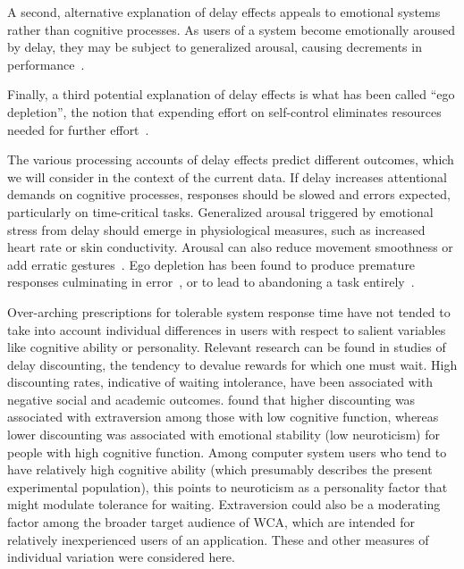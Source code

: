 \documentclass[10pt,letterpaper]{article}
\providecommand{\DIFaddtex}[1]{#1} %
\providecommand{\DIFdeltex}[1]{} %
\providecommand{\DIFaddbegin}{\protect\color{blue}} %
\providecommand{\DIFaddend}{\protect\color{black}} %
\providecommand{\DIFdelbegin}{\protect\color{red}} %
\providecommand{\DIFdelend}{\protect\color{black}} %
\providecommand{\DIFadd}[1]{\texorpdfstring{\DIFaddtex{#1}}{#1}} %
\providecommand{\DIFdel}[1]{\texorpdfstring{\DIFdeltex{#1}}{}} %
\newcommand{\DIFscaledelfig}{0.5}
\newlength{\DIFdelgraphicswidth} %
\newlength{\DIFdelgraphicsheight} %
\newcommand{\DIFaddincludegraphics}[2][]{{\color{blue}\fbox{\DIFOincludegraphics[#1]{#2}}}} %
\newcommand{\DIFdelincludegraphics}[2][]{%
\sbox{\DIFdelgraphicsbox}{\DIFOincludegraphics[#1]{#2}}%
\settoboxwidth{\DIFdelgraphicswidth}{\DIFdelgraphicsbox} %
\settoboxtotalheight{\DIFdelgraphicsheight}{\DIFdelgraphicsbox} %
\scalebox{\DIFscaledelfig}{%
\parbox[b]{\DIFdelgraphicswidth}{\usebox{\DIFdelgraphicsbox}\\[-\baselineskip] \rule{\DIFdelgraphicswidth}{0em}}\llap{\resizebox{\DIFdelgraphicswidth}{\DIFdelgraphicsheight}{%
\setlength{\unitlength}{\DIFdelgraphicswidth}%
\begin{picture}(1,1)%
\thicklines\linethickness{2pt} %
{\color[rgb]{1,0,0}\put(0,0){\framebox(1,1){}}}%
{\color[rgb]{1,0,0}\put(0,0){\line( 1,1){1}}}%
{\color[rgb]{1,0,0}\put(0,1){\line(1,-1){1}}}%
\end{picture}%
}\hspace*{3pt}}} %
} %
\DeclareRobustCommand{\DIFaddbegin}{\DIFOaddbegin \let\includegraphics\DIFaddincludegraphics} %
\DeclareRobustCommand{\DIFaddend}{\DIFOaddend \let\includegraphics\DIFOincludegraphics} %
\DeclareRobustCommand{\DIFdelbegin}{\DIFOdelbegin \let\includegraphics\DIFdelincludegraphics} %
\DeclareRobustCommand{\DIFdelend}{\DIFOaddend \let\includegraphics\DIFOincludegraphics} %
\begin{document}
\DIFdelbegin \DIFdel{An alternative view }\DIFdelend \DIFaddbegin \DIFadd{A second, alternative explanation }\DIFaddend of delay effects appeals to emotional systems rather than cognitive processes.
As users of a system become emotionally aroused by delay, they may be subject to generalized arousal, causing decrements in performance~\autocite{lee2019limiting}.

\DIFdelbegin \DIFdel{A }\DIFdelend \DIFaddbegin \DIFadd{Finally, a }\DIFaddend third potential explanation of delay effects is what has been called ``ego depletion'', the notion that expending effort on self-control eliminates resources needed for further effort~\autocite{baumeister74tice,lin2020strong}.

The various processing accounts of delay effects predict different outcomes, which we will consider in the context of the current data.
If delay increases attentional demands on cognitive processes, responses should be slowed and errors expected, particularly on time-critical tasks.
Generalized arousal triggered by emotional stress from delay should emerge in physiological measures, such as increased heart rate or skin conductivity.
Arousal can also reduce movement smoothness or add erratic gestures~\autocite{pijpers2003anxiety}.
Ego depletion has been found to produce premature responses culminating in error~\autocite{lin2020strong}, or to lead to abandoning a task entirely~\autocite{baumeister74tice}. 

Over-arching prescriptions for tolerable system response time have not tended to take into account individual differences in users with respect to salient variables like cognitive ability or personality. 
Relevant research can be found in studies of delay discounting, the tendency to devalue rewards for which one must wait.
High discounting rates, indicative of waiting intolerance, have been associated with negative social and academic outcomes.
\textcite{hirsh2008delay} found that higher discounting was associated with extraversion among those with low cognitive function, whereas lower discounting was associated with emotional stability (low neuroticism) for people with high cognitive function.
Among computer system users who tend to have relatively high cognitive ability (which presumably describes the present experimental population), this points to neuroticism as a personality factor that might modulate tolerance for waiting. Extraversion could also  be  a moderating factor among the broader target audience of WCA, which are intended for relatively inexperienced users of an application.
These and other measures of individual variation were considered here.
\end{document}
